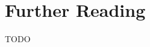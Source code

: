 \section{Further Reading}

TODO


\begin{comment}
   - The i.i.d. assumption, and extended chain rule
   - Logistic regression as a conditional model
   - Maximum entropy models
   - Generative modeling, non-naive Bayes and memorizing data
   - Naive Bayes and feature independence
   - Naive Bayes as a linear model
\end{comment}

